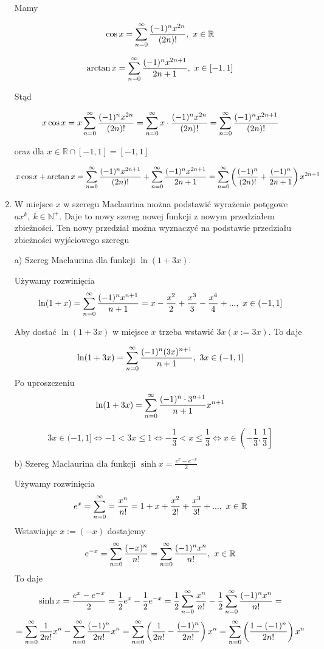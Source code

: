\begin{enumerate}
    Mamy

    $$ \cos x = \sum\limits_{n = 0}^{\infty} \frac{(-1)^n x^{2n}}{(2n)!}, \ x \in \mathbb{R} $$

    $$ \arctan x = \sum\limits_{n = 0}^{\infty} \frac{(-1)^n x^{2n+1}}{2n+1}, \ x \in [-1, 1] $$

    Stąd

    $$ x \cos x = x \sum\limits_{n = 0}^{\infty} \frac{(-1)^n x^{2n}}{(2n)!} = \sum\limits_{n = 0}^{\infty} x \cdot \frac{(-1)^n x^{2n}}{(2n)!} 
    = \sum\limits_{n = 0}^{\infty} \frac{(-1)^n x^{2n+1}}{(2n)!}$$

    oraz dla $ x \in \mathbb{R} \cap [-1, 1] = [-1, 1] $

    $$ x \cos x + \arctan x = \sum\limits_{n = 0}^{\infty} \frac{(-1)^n x^{2n+1}}{(2n)!} + \sum\limits_{n = 0}^{\infty} \frac{(-1)^n x^{2n+1}}{2n+1} = 
    \sum\limits_{n = 0}^{\infty} \left( \frac{(-1)^n}{(2n)!} + \frac{(-1)^n}{2n+1} \right) x^{2n+1} $$ 

    \item W miejsce $x$ w szeregu Maclaurina można podstawić wyrażenie potęgowe $ ax^k, \ k \in \mathbb{N}^+ $.
    Daje to nowy szereg nowej funkcji z nowym przedziałem zbieżności. Ten nowy przedział można wyznaczyć na podstawie
    przedziału zbieżności wyjściowego szeregu \\

    \begin{przyklad}

    a) Szereg Maclaurina dla funkcji $ \ln (1+3x) $.

    Używamy rozwinięcia 
    $$ \ln (1+x) = \sum\limits_{n = 0}^{\infty} \frac{(-1)^n x^{n+1}}{n+1} = x - \frac{x^2}{2} + \frac{x^3}{3} - \frac{x^4}{4} + ... , \ x \in (-1, 1] $$

    Aby dostać $ \ln(1+3x) $ w miejsce $x$ trzeba wstawić $ 3x ( x := 3x)$. To daje

    $$ \ln(1+3x) = \sum\limits_{n = 0}^{\infty} \frac{(-1)^n (3x)^{n+1}}{n+1}, \ 3x \in (-1, 1] $$
    Po uproszczeniu 
    $$ \ln(1+3x) = \sum\limits_{n = 0}^{\infty} \frac{(-1)^n \cdot 3^{n+1}}{n+1} x^{n+1} $$

    $$ 3x \in (-1, 1] \Leftrightarrow -1 < 3x \leq 1 \Leftrightarrow -\frac{1}{3} < x \leq \frac{1}{3} \Leftrightarrow x \in \left( -\frac{1}{3}, \frac{1}{3} \right] $$
    \end{przyklad}

    \begin{przyklad}
    b) Szereg Maclaurina dla funkcji $ \sinh x = \frac{e^x - e^{-x}}{2} $

    Używamy rozwinięcia
    $$ e^x = \sum\limits_{n = 0}^{\infty} = \frac{x^n}{n!} = 1 + x + \frac{x^2}{2!} + \frac{x^3}{3!} + ... , \ x \in \mathbb{R} $$
    Wstawiając $ x:=(-x) $ dostajemy 
    $$ e^{-x} = \sum\limits_{n = 0}^{\infty} \frac{(-x)^n}{n!} = \sum\limits_{n = 0}^{\infty} \frac{(-1)^n x^n}{n!}, \ x \in \mathbb{R} $$
    To daje
    $$ \sinh x = \frac{e^x - e^{-x}}{2} = \frac{1}{2}e^x - \frac{1}{2}e^{-x} =
    \frac{1}{2} \sum\limits_{n = 0}^{\infty} \frac{x^n}{n!} - \frac{1}{2} \sum\limits_{n = 0}^{\infty} \frac{(-1)^n x^n}{n!} 
    =$$ $$ =  \sum\limits_{n = 0}^{\infty} \frac{1}{2n!} x^n - \sum\limits_{n = 0}^{\infty} \frac{(-1)^n}{2n!} x^n
    = \sum\limits_{n = 0}^{\infty} \left( \frac{1}{2n!} - \frac{(-1)^n}{2n!} \right) x^n 
    = \sum\limits_{n = 0}^{\infty} \left( \frac{1 - (-1)^n}{2n!} \right) x^n $$


\end{przyklad}
\end{enumerate}
